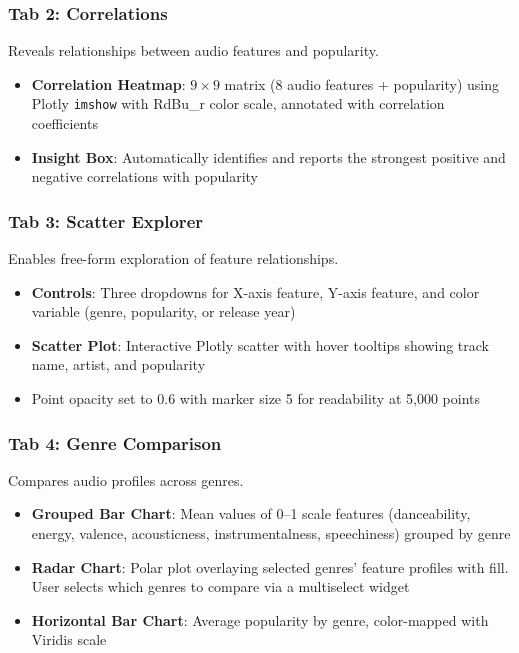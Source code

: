\documentclass[12pt,a4paper]{article}
\begin{document}
\subsubsection{Tab 2: Correlations}

Reveals relationships between audio features and popularity.

\begin{itemize}[noitemsep]
    \item \textbf{Correlation Heatmap}: $9 \times 9$ matrix (8 audio features + popularity) using Plotly \texttt{imshow} with RdBu\_r color scale, annotated with correlation coefficients
    \item \textbf{Insight Box}: Automatically identifies and reports the strongest positive and negative correlations with popularity
\end{itemize}

\subsubsection{Tab 3: Scatter Explorer}

Enables free-form exploration of feature relationships.

\begin{itemize}[noitemsep]
    \item \textbf{Controls}: Three dropdowns for X-axis feature, Y-axis feature, and color variable (genre, popularity, or release year)
    \item \textbf{Scatter Plot}: Interactive Plotly scatter with hover tooltips showing track name, artist, and popularity
    \item Point opacity set to 0.6 with marker size 5 for readability at 5{,}000 points
\end{itemize}

\subsubsection{Tab 4: Genre Comparison}

Compares audio profiles across genres.

\begin{itemize}[noitemsep]
    \item \textbf{Grouped Bar Chart}: Mean values of 0--1 scale features (danceability, energy, valence, acousticness, instrumentalness, speechiness) grouped by genre
    \item \textbf{Radar Chart}: Polar plot overlaying selected genres' feature profiles with fill. User selects which genres to compare via a multiselect widget
    \item \textbf{Horizontal Bar Chart}: Average popularity by genre, color-mapped with Viridis scale
\end{itemize}
\end{document}

